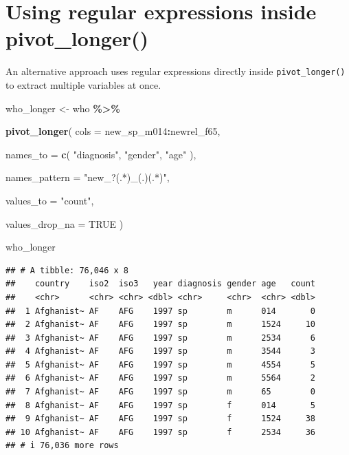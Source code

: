 \documentclass[
  11pt,
  oneside]{book}
\newenvironment{Shaded}{\begin{snugshade}}{\end{snugshade}}
\newcommand{\AttributeTok}[1]{\textcolor[rgb]{0.13,0.29,0.53}{#1}}
\newcommand{\ConstantTok}[1]{\textcolor[rgb]{0.56,0.35,0.01}{#1}}
\newcommand{\FunctionTok}[1]{\textcolor[rgb]{0.13,0.29,0.53}{\textbf{#1}}}
\newcommand{\NormalTok}[1]{#1}
\newcommand{\OtherTok}[1]{\textcolor[rgb]{0.56,0.35,0.01}{#1}}
\newcommand{\SpecialCharTok}[1]{\textcolor[rgb]{0.81,0.36,0.00}{\textbf{#1}}}
\newcommand{\StringTok}[1]{\textcolor[rgb]{0.31,0.60,0.02}{#1}}
\begin{document}
\section{Using regular expressions inside pivot\_longer()}\label{using-regular-expressions-inside-pivot_longer}

An alternative approach uses regular expressions directly inside \texttt{pivot\_longer()} to extract multiple variables at once.

\begin{Shaded}
\begin{Highlighting}[]
\NormalTok{who\_longer }\OtherTok{\textless{}{-}}\NormalTok{ who }\SpecialCharTok{\%\textgreater{}\%}
  
  \FunctionTok{pivot\_longer}\NormalTok{(}
    \AttributeTok{cols =}\NormalTok{ new\_sp\_m014}\SpecialCharTok{:}\NormalTok{newrel\_f65,}
    
    \AttributeTok{names\_to =} \FunctionTok{c}\NormalTok{(}
      \StringTok{"diagnosis"}\NormalTok{,}
      \StringTok{"gender"}\NormalTok{,}
      \StringTok{"age"}
\NormalTok{    ),}
    
    \AttributeTok{names\_pattern =}
      \StringTok{"new\_?(.*)\_(.)(.*)"}\NormalTok{,}
    
    \AttributeTok{values\_to =} \StringTok{"count"}\NormalTok{,}
    
    \AttributeTok{values\_drop\_na =} \ConstantTok{TRUE}
\NormalTok{  )}

\NormalTok{who\_longer}
\end{Highlighting}
\end{Shaded}

\begin{verbatim}
## # A tibble: 76,046 x 8
##    country    iso2  iso3   year diagnosis gender age   count
##    <chr>      <chr> <chr> <dbl> <chr>     <chr>  <chr> <dbl>
##  1 Afghanist~ AF    AFG    1997 sp        m      014       0
##  2 Afghanist~ AF    AFG    1997 sp        m      1524     10
##  3 Afghanist~ AF    AFG    1997 sp        m      2534      6
##  4 Afghanist~ AF    AFG    1997 sp        m      3544      3
##  5 Afghanist~ AF    AFG    1997 sp        m      4554      5
##  6 Afghanist~ AF    AFG    1997 sp        m      5564      2
##  7 Afghanist~ AF    AFG    1997 sp        m      65        0
##  8 Afghanist~ AF    AFG    1997 sp        f      014       5
##  9 Afghanist~ AF    AFG    1997 sp        f      1524     38
## 10 Afghanist~ AF    AFG    1997 sp        f      2534     36
## # i 76,036 more rows
\end{verbatim}
\end{document}
